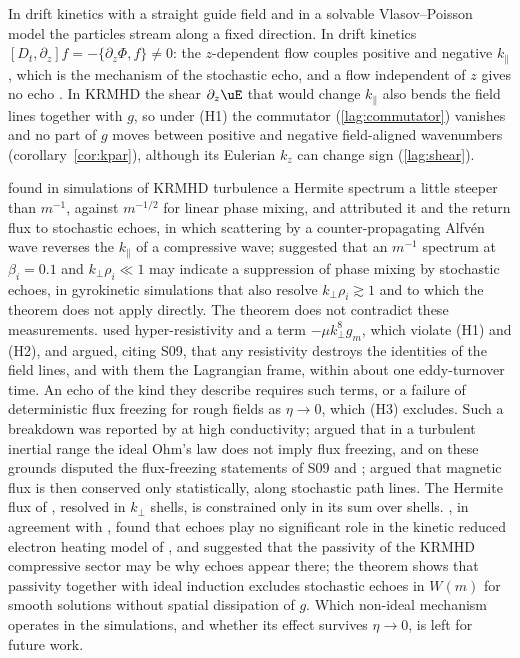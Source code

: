 In drift kinetics with a straight guide field \citep{Schekochihin2016,Parker2016} and in a solvable Vlasov--Poisson model \citep{AdkinsSchekochihin2018} the particles stream along a fixed direction. In drift kinetics $[D_t,\partial_z]f=-\{\partial_z\Phi,f\}\neq0$: the $z$-dependent flow couples positive and negative $k_\parallel$, which is the mechanism of the stochastic echo, and a flow independent of $z$ gives no echo \citetext{\citealp[appendix~B]{Schekochihin2016}; \citealp[\S5.2]{KanekarThesis2015}}. In KRMHD the shear $\partial_z\uE$ that would change $k_\parallel$ also bends the field lines together with $g$, so under (H1) the commutator (\ref{lag:commutator}) vanishes and no part of $g$ moves between positive and negative field-aligned wavenumbers (corollary~\ref{cor:kpar}), although its Eulerian $k_z$ can change sign (\ref{lag:shear}).

\citet{Meyrand2019} found in simulations of KRMHD turbulence a Hermite spectrum a little steeper than $m^{-1}$, against $m^{-1/2}$ for linear phase mixing, and attributed it and the return flux to stochastic echoes, in which scattering by a counter-propagating Alfv\'en wave reverses the $k_\parallel$ of a compressive wave; \citet{Kawazura2020} suggested that an $m^{-1}$ spectrum at $\beta_i=0.1$ and $k_\perp\rho_i\ll1$ may indicate a suppression of phase mixing by stochastic echoes, in gyrokinetic simulations that also resolve $k_\perp\rho_i\gtrsim1$ and to which the theorem does not apply directly. The theorem does not contradict these measurements. \citet{Meyrand2019} used hyper-resistivity and a term $-\mu k_\perp^8g_m$, which violate (H1) and (H2), and argued, citing S09, that any resistivity destroys the identities of the field lines, and with them the Lagrangian frame, within about one eddy-turnover time. An echo of the kind they describe requires such terms, or a failure of deterministic flux freezing for rough fields as $\eta\to0$, which (H3) excludes. Such a breakdown was reported by \citet{Eyink2013} at high conductivity; \citet[\S VIII.C]{Eyink2018} argued that in a turbulent inertial range the ideal Ohm's law does not imply flux freezing, and on these grounds disputed the flux-freezing statements of S09 and \citet{Kunz2015}; \citet{Jafari2026} argued that magnetic flux is then conserved only statistically, along stochastic path lines. The Hermite flux of \citet{Meyrand2019}, resolved in $k_\perp$ shells, is constrained only in its sum over shells. \citet{Adkins2025}, in agreement with \citet{Zhou2023}, found that echoes play no significant role in the kinetic reduced electron heating model of \citet{ZoccoSchekochihin2011}, and suggested that the passivity of the KRMHD compressive sector may be why echoes appear there; the theorem shows that passivity together with ideal induction excludes stochastic echoes in $W(m)$ for smooth solutions without spatial dissipation of $g$. Which non-ideal mechanism operates in the simulations, and whether its effect survives $\eta\to0$, is left for future work.
